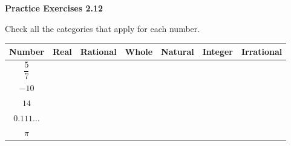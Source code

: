 \vspace{0.3ex}
\noindent\textbf{Practice Exercises 2.12}

\vspace{0.2ex}

Check all the categories that apply for each number.

{\fontsize{8}{11}\selectfont
\noindent\begin{tabular}{|c|c|c|c|c|c|c|}
\hline
\textbf{Number} & \textbf{Real} & \textbf{Rational} & \textbf{Whole} & \textbf{Natural} & \textbf{Integer} & \textbf{Irrational} \\
\hline
$\dfrac{5}{7}$ & & & & & & \\
\hline
$-10$ & & & & & & \\
\hline
$14$ & & & & & & \\
\hline
$0.111\ldots$ & & & & & & \\
\hline
$\pi$ & & & & & & \\
\hline
\end{tabular}
}



